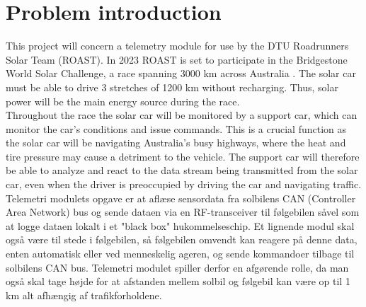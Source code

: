 \documentclass[]{article}
\begin{document}
\section{Problem introduction}

This project will concern a telemetry module for use by the DTU Roadrunners Solar Team (ROAST). In 2023 ROAST is set to participate in the Bridgestone World Solar Challenge, a race spanning 3000 km across Australia \cite{wsc}. The solar car must be able to drive 3 stretches of 1200 km without recharging. Thus, solar power will be the main energy source during the race. \\
Throughout the race the solar car will be monitored by a support car, which can monitor the car's conditions and issue commands. This is a crucial function as the solar car will be navigating Australia's busy highways, where the heat and tire pressure may cause a detriment to the vehicle. The support car will therefore be able to analyze and react to the data stream being transmitted from the solar car, even when the driver is preoccupied by driving the car and navigating traffic. \\
Telemetri modulets opgave er at aflæse sensordata fra solbilens CAN (Controller Area Network) bus og sende dataen via en RF-transceiver til følgebilen såvel som at logge dataen lokalt i et "black box" hukommelseschip. Et lignende modul skal også være til stede i følgebilen, så følgebilen omvendt kan reagere på denne data, enten automatisk eller ved menneskelig ageren, og sende kommandoer tilbage til solbilens CAN bus. Telemetri modulet spiller derfor en afgørende rolle, da man også skal tage højde for at afstanden mellem solbil og følgebil kan være op til 1 km alt afhængig af trafikforholdene.
\end{document}
